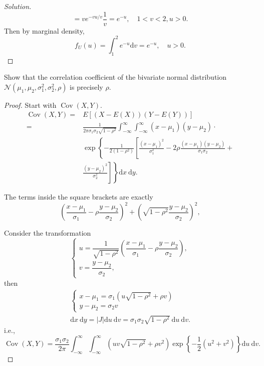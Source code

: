 \documentclass[11pt,singlecolumn, openany, citestyle=authoryear]{elegantbook}
\begin{document}
\begin{CJK}{UTF8}{gbsn}
\begin{proof}[Solution]
$$    =ve^{-vu/v}\frac{1}{v}=e^{-u}, \quad 1<v<2,u>0.
    $$
    Then by marginal density,
    $$
    f_U(u)=\int_1^2 e^{-u}\mathrm{d}v = e^{-u},\quad u>0.
    $$
\end{proof}
\begin{exercise}
    Show that the correlation coefficient of the bivariate normal distribution 
    $\mathcal{N}(\mu_1,\mu_2,\sigma_1^2,\sigma_2^2,\rho)$ is precisely $\rho$.
\end{exercise}
\begin{proof}
    Start with $\operatorname{Cov}(X, Y)$.
$$
\begin{aligned}
\operatorname{Cov}(X, Y)= & E[(X-E(X))(Y-E(Y))] \\
= & \frac{1}{2 \pi \sigma_1 \sigma_2 \sqrt{1-\rho^2}} \int_{-\infty}^{\infty} \int_{-\infty}^{\infty}\left(x-\mu_1\right)\left(y-\mu_2\right) \cdot \\
& \exp \left\{-\frac{1}{2\left(1-\rho^2\right)}\left[\frac{\left(x-\mu_1\right)^2}{\sigma_1^2}-2 \rho \frac{\left(x-\mu_1\right)\left(y-\mu_2\right)}{\sigma_1 \sigma_2}+\right.\right. \\
& \left.\left.\frac{\left(y-\mu_2\right)^2}{\sigma_2^2}\right]\right\} \mathrm{d} x \mathrm{~d} y .
\end{aligned}
$$

The terms inside the square brackets are exactly
$$
\left(\frac{x-\mu_1}{\sigma_1}-\rho \frac{y-\mu_2}{\sigma_2}\right)^2+\left(\sqrt{1-\rho^2} \frac{y-\mu_2}{\sigma_2}\right)^2,
$$

Consider the transformation
$$
\left\{\begin{array}{l}
u=\dfrac{1}{\sqrt{1-\rho^2}}\left(\dfrac{x-\mu_1}{\sigma_1}-\rho \dfrac{y-\mu_2}{\sigma_2}\right), \\
v=\dfrac{y-\mu_2}{\sigma_2},
\end{array}\right.
$$
then 
$$
\begin{gathered}
\left\{\begin{array}{l}
x-\mu_1=\sigma_1\left(u \sqrt{1-\rho^2}+\rho v\right) \\
y-\mu_2=\sigma_2 v
\end{array}\right. \\
\mathrm{d} x \mathrm{~d} y=|J| \mathrm{d} u \mathrm{~d} v=\sigma_1 \sigma_2 \sqrt{1-\rho^2} \mathrm{~d} u \mathrm{~d} v .
\end{gathered}
$$
i.e.,
$$
\operatorname{Cov}(X, Y)=\frac{\sigma_1 \sigma_2}{2 \pi} \int_{-\infty}^{\infty} \int_{-\infty}^{\infty}\left(u v \sqrt{1-\rho^2}+\rho v^2\right) \exp \left\{-\frac{1}{2}\left(u^2+v^2\right)\right\} \mathrm{d} u \mathrm{~d} v .
$$


\end{proof}
\end{CJK}
\end{document}
